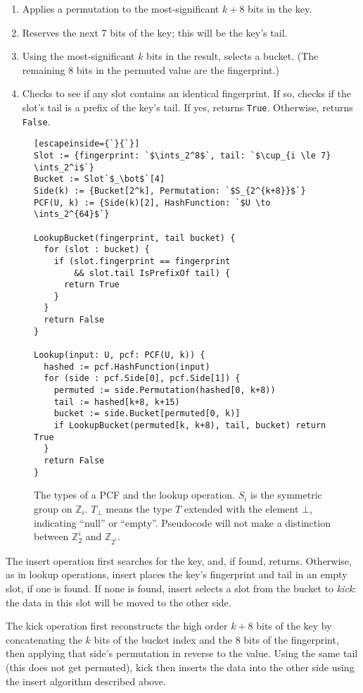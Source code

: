 \documentclass[letterpaper, 11pt]{article}
\newcommand{\ints}{\mathbb{Z}}
\begin{document}
\begin{enumerate}
\item Applies a permutation to the most-significant $k+8$ bits in the key.
\item Reserves the next 7 bits of the key; this will be the key's tail.
\item Using the most-significant $k$ bits in the result, selects a bucket.
(The remaining 8 bits in the permuted value are the fingerprint.)
\item Checks to see if any slot contains an identical fingerprint.
If so, checks if the slot's tail is a prefix of the key's tail.
If yes, returns \verb|True|.
Otherwise, returns \verb|False|.
\end{enumerate}

\begin{figure}
\begin{lstlisting}[escapeinside={`}{`}]
Slot := {fingerprint: `$\ints_2^8$`, tail: `$\cup_{i \le 7} \ints_2^i$`}
Bucket := Slot`$_\bot$`[4]
Side(k) := {Bucket[2^k], Permutation: `$S_{2^{k+8}}$`}
PCF(U, k) := {Side(k)[2], HashFunction: `$U \to \ints_2^{64}$`}

LookupBucket(fingerprint, tail bucket) {
  for (slot : bucket) {
    if (slot.fingerprint == fingerprint
        && slot.tail IsPrefixOf tail) {
      return True
    }
  }
  return False
}

Lookup(input: U, pcf: PCF(U, k)) {
  hashed := pcf.HashFunction(input)
  for (side : pcf.Side[0], pcf.Side[1]) {
    permuted := side.Permutation(hashed[0, k+8))
    tail := hashed[k+8, k+15)
    bucket := side.Bucket[permuted[0, k)]
    if LookupBucket(permuted[k, k+8), tail, bucket) return True
  }
  return False
}
\end{lstlisting}
\caption{The types of a PCF and the lookup operation.
  $S_i$ is the symmetric group on $\ints_i$.
  $T_\bot$ means the type $T$ extended with the element $\bot$, indicating ``null'' or ``empty''.
  Pseudocode will not make a distinction between $\ints_2^i$ and $\ints_{2^i}$.
}
\end{figure}

The insert operation first searches for the key, and, if found, returns.
Otherwise, as in lookup operations, insert places the key's fingerprint and tail in an empty slot, if one is found.
If none is found, insert selects a slot from the bucket to {\em kick}: the data in this slot will be moved to the other side.

The kick operation first reconstructs the high order $k + 8$ bits of the key by concatenating the $k$ bits of the bucket index and the $8$ bits of the fingerprint, then applying that side's permutation in reverse to the value.
Using the same tail (this does not get permuted), kick then inserts the data into the other side using the insert algorithm described above.
\end{document}
